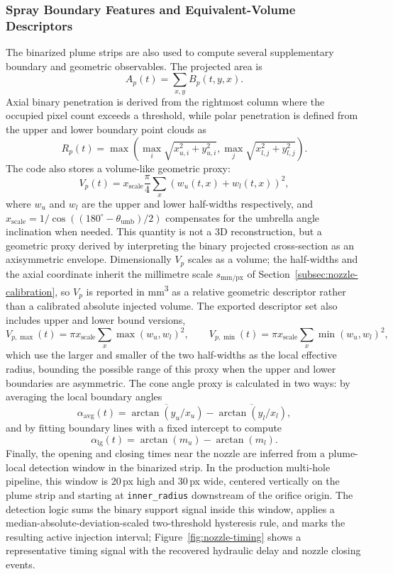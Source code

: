 \subsubsection{Spray Boundary Features and Equivalent-Volume Descriptors}\label{subsec:boundary-features}

The binarized plume strips are also used to compute several supplementary boundary and geometric observables.
The projected area is
\[
A_p(t)=\sum_{x,y} B_p(t,y,x).
\]
Axial binary penetration is derived from the rightmost column where the occupied pixel count exceeds a threshold, while polar penetration is defined from the upper and lower boundary point clouds as
\[
R_p(t)=\max\!\left(
\max_i \sqrt{x_{u,i}^2+y_{u,i}^2},
\max_j \sqrt{x_{l,j}^2+y_{l,j}^2}
\right).
\]
The code also stores a volume-like geometric proxy:
\[
V_p(t)=x_{\mathrm{scale}} \frac{\pi}{4}\sum_x \left(w_u(t,x)+w_l(t,x)\right)^2,
\]
where \(w_u\) and \(w_l\) are the upper and lower half-widths respectively, and \(x_{\mathrm{scale}}=1/\cos((180^\circ-\theta_{\mathrm{umb}})/2)\) compensates for the umbrella angle inclination when needed.
This quantity is not a 3D reconstruction, but a geometric proxy derived by interpreting the binary projected cross-section as an axisymmetric envelope. Dimensionally \(V_p\) scales as a volume; the half-widths and the axial coordinate inherit the millimetre scale \(s_{\mathrm{mm/px}}\) of Section~\ref{subsec:nozzle-calibration}, so \(V_p\) is reported in \si{mm^3} as a relative geometric descriptor rather than a calibrated absolute injected volume.
The exported descriptor set also includes upper and lower bound versions,
\[
V_{p,\max}(t)=\pi x_{\mathrm{scale}}\sum_x \max(w_u,w_l)^2,\qquad
V_{p,\min}(t)=\pi x_{\mathrm{scale}}\sum_x \min(w_u,w_l)^2,
\]
which use the larger and smaller of the two half-widths as the local effective radius, bounding the possible range of this proxy when the upper and lower boundaries are asymmetric.
The cone angle proxy is calculated in two ways: by averaging the local boundary angles
\[
\alpha_{\mathrm{avg}}(t)=\overline{\arctan(y_u/x_u)}-\overline{\arctan(y_l/x_l)},
\]
and by fitting boundary lines with a fixed intercept to compute
\[
\alpha_{\mathrm{lg}}(t)=\arctan(m_u)-\arctan(m_l).
\]
Finally, the opening and closing times near the nozzle are inferred from a plume-local detection window in the binarized strip.
In the production multi-hole pipeline, this window is 20\,px high and 30\,px wide, centered vertically on the plume strip and starting at \texttt{inner\_radius} downstream of the orifice origin.
The detection logic sums the binary support signal inside this window, applies a median-absolute-deviation-scaled two-threshold hysteresis rule, and marks the resulting active injection interval; Figure~\ref{fig:nozzle-timing} shows a representative timing signal with the recovered hydraulic delay and nozzle closing events.

